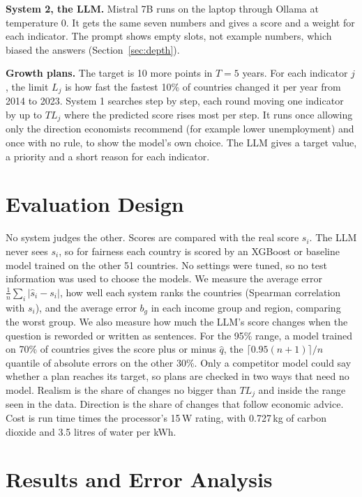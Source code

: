 \documentclass{article}
\begin{document}
\textbf{System 2, the LLM.} Mistral 7B \citep{jiang2023mistral} runs on the laptop through Ollama at temperature 0. It gets the same seven numbers and gives a score and a weight for each indicator. The prompt shows empty slots, not example numbers, which biased the answers (Section~\ref{sec:depth}).

\textbf{Growth plans.} The target is 10 more points in $T=5$ years. For each indicator $j$, the limit $L_j$ is how fast the fastest 10\% of countries changed it per year from 2014 to 2023. System 1 searches step by step, each round moving one indicator by up to $T L_j$ where the predicted score rises most per step. It runs once allowing only the direction economists recommend (for example lower unemployment) and once with no rule, to show the model's own choice. The LLM gives a target value, a priority and a short reason for each indicator.

\section{Evaluation Design}
No system judges the other. Scores are compared with the real score $s_i$. The LLM never sees $s_i$, so for fairness each country is scored by an XGBoost or baseline model trained on the other 51 countries. No settings were tuned, so no test information was used to choose the models. We measure the average error $\tfrac1n\sum_i|\hat s_i-s_i|$, how well each system ranks the countries (Spearman correlation with $s_i$), and the average error $b_g$ in each income group and region, comparing the worst group. We also measure how much the LLM's score changes when the question is reworded or written as sentences. For the 95\% range, a model trained on 70\% of countries gives the score plus or minus $\hat q$, the $\lceil 0.95(n+1)\rceil/n$ quantile of absolute errors on the other 30\%. Only a competitor model could say whether a plan reaches its target, so plans are checked in two ways that need no model. Realism is the share of changes no bigger than $T L_j$ and inside the range seen in the data. Direction is the share of changes that follow economic advice. Cost is run time times the processor's 15\,W rating, with 0.727\,kg of carbon dioxide \citep{cea2024baseline} and 3.5 litres of water per kWh.

\section{Results and Error Analysis}
\end{document}
